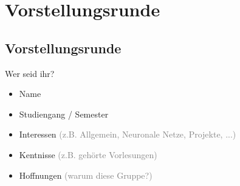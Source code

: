 \section{Vorstellungsrunde}

\subsection*{Vorstellungsrunde}

\begin{frame}{Wer seid ihr?}
    \begin{itemize}
        \item Name
        \item Studiengang / Semester
        \item Interessen \textcolor{gray}{(z.B. Allgemein, Neuronale Netze, Projekte, ...)}
        \item Kentnisse \textcolor{gray}{(z.B. gehörte Vorlesungen)}
        \item Hoffnungen \textcolor{gray}{(warum diese Gruppe?)}
    \end{itemize}
\end{frame}
